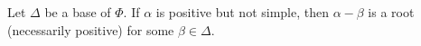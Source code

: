 Let $\Delta$ be a base of $\Phi$. If $\alpha$ is positive but not simple, then $\alpha - \beta$ is a root (necessarily positive) for some $\beta \in \Delta$.